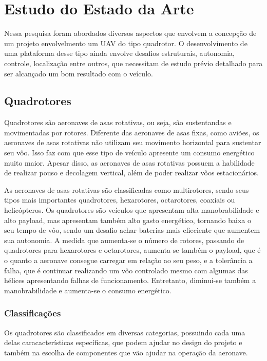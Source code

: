 \chapter{Estudo do Estado da Arte}
\label{chap:metod}
Nessa pesquisa foram abordados diversos aspectos que envolvem a concepção de um projeto envolvelmento um UAV do tipo quadrotor. O desenvolvimento de uma plataforma desse tipo ainda envolve desafios estruturais, autonomia, controle, localização entre outros, que necessitam de estudo prévio detalhado para ser alcançado um bom resultado com o veículo.

\section{Quadrotores}
Quadrotores são aeronaves de asas rotativas, ou seja, são sustentandas e movimentadas por rotores. Diferente das aeronaves de asas fixas, como aviões, os aeronaves de asas rotativas não utilizam seu movimento horizontal para sustentar seu vôo. Isso faz com que esse tipo de veículo apresente um consumo energético muito maior. Apesar disso, as aeronaves de asas rotativas possuem a habilidade de realizar pouso e decolagem vertical, além de poder realizar vôos estacionários.

As aeronaves de asas rotativas são classificadas como multirotores, sendo seus tipos mais importantes quadrotores, hexarotores, octarotores, coaxiais ou helicópteros. Os quadrotores são veículos que apresentam alta manobrabilidade e alto payload, mas apresentam também alto gasto energético, tornando baixa o seu tempo de vôo, sendo um desafio achar baterias mais efieciente que aumentem sua autonomia. A medida que aumenta-se o número de rotores, passando de quadrotores para hexarotores e octarotores, aumenta-se também o payload, que é o quanto a aeronave consegue carregar em relação ao seu peso, e a tolerância a falha, que é continuar realizando um vôo controlado mesmo com algumas das hélices apresentando falhas de funcionamento. Entretanto, diminui-se também a manobrabilidade e aumenta-se o consumo energético.

\subsection{Classificações}
Os quadrotores são classificados em diversas categorias, possuindo cada uma delas caracacterísticas específicas, que podem ajudar no design do projeto e também na escolha de componentes que vão ajudar na operação da aeronave.

